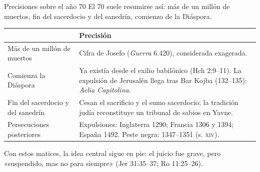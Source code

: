\begin{frame}{Precisiones sobre el año 70}
\footnotesize El 70 suele resumirse así: más de un millón de muertos, fin del sacerdocio y del sanedrín, comienzo de la Diáspora.\par\medskip
\centering\scriptsize\renewcommand{\arraystretch}{1.3}
\begin{tabular}{>{\RaggedRight\arraybackslash}p{3.3cm}>{\RaggedRight\arraybackslash}p{8.6cm}}
\toprule
{\color{ladrillo}\bfseries Afirmación} & {\color{ladrillo}\bfseries Precisión}\\\midrule
Más de un millón de muertos & Cifra de Josefo (\emph{Guerra} 6.420), considerada exagerada.\\
Comienza la Diáspora & Ya existía desde el exilio babilónico (Hch 2:9--11). La expulsión de Jerusalén llega tras Bar Kojba (132--135): \emph{Aelia Capitolina}.\\
Fin del sacerdocio y del sanedrín & Cesan el sacrificio y el sumo sacerdocio; la tradición judía reconstituye un tribunal de sabios en Yavne.\\
Persecuciones posteriores & Expulsiones: Inglaterra 1290; Francia 1306 y 1394; España 1492. Peste negra: 1347--1351 (s. \textsc{xiv}).\\
\bottomrule
\end{tabular}
\elabpropia
\vspace{6pt}
\begin{clave}
Con estos matices, la idea central sigue en pie: el juicio fue grave, pero «suspendido, mas no para siempre» (Jer 31:35--37; Ro 11:25--26).
\end{clave}
\end{frame}

